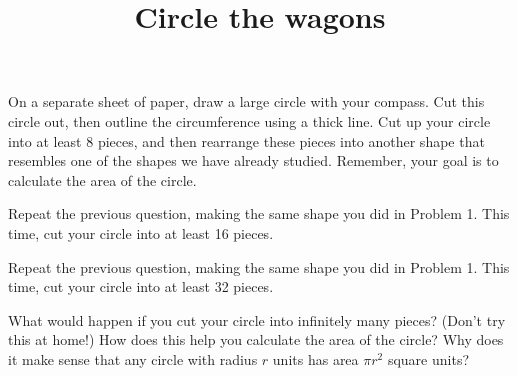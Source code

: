 \documentclass[nooutcomes,noauthor]{ximera}
\title{Circle the wagons}
\begin{document}
\begin{abstract}
\end{abstract}
\maketitle



\begin{problem}
On a separate sheet of paper, draw a large circle with your compass.  Cut this circle out, then outline the circumference using a thick line.  Cut up your circle into at least 8 pieces, and then rearrange these pieces into another shape that resembles one of the shapes we have already studied.  Remember, your goal is to calculate the area of the circle.


\end{problem}

\begin{problem}
Repeat the previous question, making the same shape you did in Problem 1.  This time, cut your circle into at least 16 pieces.


\end{problem}

\begin{problem}
Repeat the previous question, making the same shape you did in Problem 1.  This time, cut your circle into at least 32 pieces.
\end{problem}

\begin{problem}
What would happen if you cut your circle into infinitely many pieces?  (Don't try this at home!)  How does this help you calculate the area of the circle?  Why does it make sense that any circle with radius $r$ units has area $\pi r^2$ square units?


\end{problem}


\newpage
\end{document}
